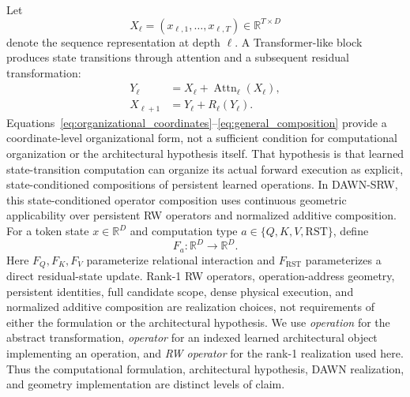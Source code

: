 \documentclass{article}
\newcommand{\R}{\mathbb{R}}
\newcommand{\DAWN}{DAWN-SRW}
\begin{document}
Let
\[
X_\ell=(x_{\ell,1},\ldots,x_{\ell,T})\in\R^{T\times D}
\]
denote the sequence representation at depth \(\ell\). A Transformer-like block
produces state transitions through attention and a subsequent residual transformation:
\begin{align}
Y_\ell&=X_\ell+\operatorname{Attn}_\ell(X_\ell),\\
X_{\ell+1}&=Y_\ell+R_\ell(Y_\ell).
\label{eq:state_transitions}
\end{align}
Equations~\ref{eq:organizational_coordinates}--\ref{eq:general_composition}
provide a coordinate-level organizational form, not a sufficient condition for
computational organization or the architectural hypothesis itself. That
hypothesis is that learned state-transition computation can organize its actual
forward execution as explicit, state-conditioned compositions of persistent
learned operations. In \DAWN{}, this state-conditioned operator composition uses
continuous geometric applicability over persistent RW operators and normalized
additive composition. For a token state \(x\in\R^D\) and
computation type \(a\in\{Q,K,V,\mathrm{RST}\}\), define
\begin{equation}
F_a:\R^D\rightarrow\R^D.
\label{eq:composed_output}
\end{equation}
Here \(F_Q,F_K,F_V\) parameterize relational interaction and
\(F_{\mathrm{RST}}\) parameterizes a direct residual-state update. Rank-1 RW
operators, operation-address geometry, persistent identities, full candidate
scope, dense physical execution, and normalized additive composition are
realization choices, not requirements of either the formulation or the
architectural hypothesis. We use \emph{operation} for the abstract
transformation, \emph{operator} for an indexed learned architectural object
implementing an operation, and \emph{RW operator} for the rank-1 realization
used here. Thus the computational formulation, architectural hypothesis, DAWN
realization, and geometry implementation are distinct levels of claim.
\end{document}
